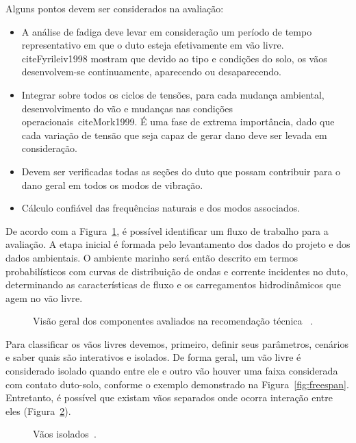 Alguns pontos devem ser considerados na avaliação:
\begin{itemize}
\item A análise de fadiga deve levar em consideração um período de tempo representativo em que o duto esteja efetivamente em vão livre.
cite{Fyrileiv1998} mostram que devido ao tipo e condições do solo, os vãos desenvolvem-se continuamente, aparecendo ou desaparecendo.

\item Integrar sobre todos os ciclos de tensões, para cada mudança ambiental, desenvolvimento do vão e mudanças nas condições operacionais~cite{Mork1999}. É uma fase de extrema importância, dado que cada variação de tensão que seja capaz de gerar dano deve ser levada em consideração.

\item Devem ser verificadas todas as seções do duto que possam contribuir para o dano geral em todos os modos de vibração.

\item Cálculo confiável das frequências naturais e dos modos associados.
\end{itemize}

De acordo com a Figura~\ref{fig:viv-dnvchart}, é possível identificar um fluxo de trabalho para a avaliação.
A etapa inicial é formada pelo levantamento dos dados do projeto e dos dados ambientais.
O ambiente marinho será então descrito em termos probabilísticos com curvas de distribuição de ondas e corrente incidentes no duto, determinando as características de fluxo e os carregamentos hidrodinâmicos que agem no vão livre.

\begin{figure}[hbt!]
\centering
\caption{Visão geral dos componentes avaliados na recomendação técnica ~\cite{DNV2017}.}
\label{fig:viv-dnvchart}

\end{figure}

Para classificar os vãos livres devemos, primeiro, definir seus parâmetros, cenários e saber quais são interativos e isolados.
De forma geral, um vão livre é considerado isolado quando entre ele e outro vão houver uma faixa considerada com contato duto-solo, conforme o exemplo demonstrado na Figura~\ref{fig:freespan}.
Entretanto, é possível que existam vãos separados onde ocorra interação entre eles (Figura~\ref{fig:viv-vaoisoint}).

\begin{figure}[hbt!]
\centering
\caption{Vãos isolados~\cite{DNV2017}.}
\label{fig:viv-vaoisoint}

\end{figure}

